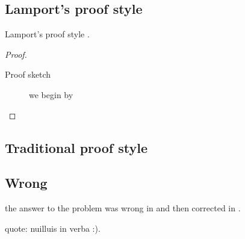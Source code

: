 \subsection{Lamport's proof style}
%
Lamport's proof style \cite{lamport:1993,lamport:2012}.

\begin{proof}
%
\begin{description}
%
\item[Proof sketch] we begin by
%
\end{description}
%
\end{proof}


\subsection{Traditional proof style}
%



\subsection{Wrong}
%
the answer to the problem was wrong in \cite{thorne:2011} and then corrected in \cite{thorne:2013}.

quote: nuilluis in verba :).


